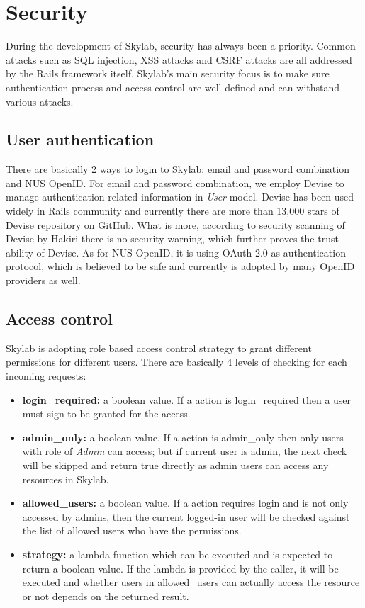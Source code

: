 \chapter{Security} \label{security}

During the development of Skylab, security has always been a priority. Common attacks such as SQL injection, XSS attacks and CSRF attacks are all addressed by the Rails framework itself. Skylab's main security focus is to make sure authentication process and access control are well-defined and can withstand various attacks.

\section{User authentication}

There are basically 2 ways to login to Skylab: email and password combination and NUS OpenID. For email and password combination, we employ Devise to manage authentication related information in \textit{User} model. Devise has been used widely in Rails community and currently there are more than 13,000 stars of Devise repository on GitHub\cite{citationdevise}. What is more, according to security scanning of Devise by Hakiri there is no security warning, which further proves the trust-ability of Devise\cite{citationdevisehakiri}. As for NUS OpenID, it is using OAuth 2.0 as authentication protocol, which is believed to be safe and currently is adopted by many OpenID providers as well\cite{citationnusopenid}.

\section{Access control}

Skylab is adopting role based access control strategy to grant different permissions for different users. There are basically 4 levels of checking for each incoming requests:

\begin{itemize}
  \item \textbf{login\_required:} a boolean value. If a action is login\_required then a user must sign to be granted for the access.
  \item \textbf{admin\_only:} a boolean value. If a action is admin\_only then only users with role of \textit{Admin} can access; but if current user is admin, the next check will be skipped and return true directly as admin users can access any resources in Skylab.
  \item \textbf{allowed\_users:} a boolean value. If a action requires login and is not only accessed by admins, then the current logged-in user will be checked against the list of allowed users who have the permissions.
  \item \textbf{strategy:} a lambda function which can be executed and is expected to return a boolean value. If the lambda is provided by the caller, it will be executed and whether users in allowed\_users can actually access the resource or not depends on the returned result.
\end{itemize}

